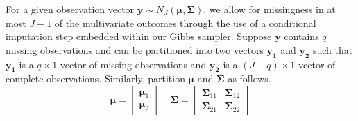 \documentclass{article}
\begin{document}
For a given observation vector $\mathbf{y} \sim N_J(\boldsymbol\mu, \boldsymbol\Sigma)$, we allow for missingness in at most $J - 1$ of the multivariate outcomes through the use of a conditional imputation step embedded within our Gibbs sampler. Suppose $\mathbf{y}$ contains $q$ missing observations and can be partitioned into two vectors $\mathbf{y_{1}}$ and $\mathbf{y_{2}}$ such that $\mathbf{y_{1}}$ is a $q \times 1$ vector of missing observations and $\mathbf{y_{2}}$ is a $(J-q) \times 1$ vector of complete observations. Similarly, partition $\boldsymbol\mu$ and $\boldsymbol\Sigma$ as follows.
$$\boldsymbol\mu = \begin{bmatrix} \boldsymbol\mu_1 \\ \boldsymbol\mu_2 \end{bmatrix} \ \ \ \ \ \boldsymbol\Sigma = \begin{bmatrix} \boldsymbol\Sigma_{11} & \boldsymbol\Sigma_{12} \\ \boldsymbol\Sigma_{21} & \boldsymbol\Sigma_{22} \end{bmatrix}$$
\end{document}
